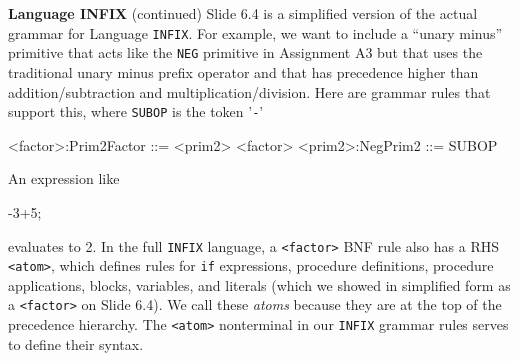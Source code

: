 \begin{minipage}[t]{\sw}
\slidenumber
\LARGE
{\bf Language INFIX} (continued)\exx
Slide 6.4 is a simplified version
of the actual grammar for Language \verb'INFIX'.
For example,
we want to include a ``unary minus'' primitive
that acts like the \verb'NEG' primitive in Assignment A3
but that uses the traditional unary minus prefix operator
and that has precedence higher than addition/subtraction
and multiplication/division.
Here are grammar rules that support this,
where \verb'SUBOP' is the token '\verb'-''
{\Large
\begin{qv}
<factor>:Prim2Factor  ::= <prim2> <factor>
<prim2>:NegPrim2      ::= SUBOP
\end{qv}
}
An expression like
{\Large
\begin{qv}
-3+5;
\end{qv}
}
evaluates to 2.\exx
In the full \verb'INFIX' language,
a \verb'<factor>' BNF rule also has a RHS \verb'<atom>',
which defines rules for 
\verb'if' expressions,
procedure definitions,
procedure applications,
blocks,
variables,
and literals
(which we showed in simplified form as a \verb'<factor>'
on Slide 6.4).
We call these {\em atoms}
because they are at the top of the precedence hierarchy.
The \verb'<atom>' nonterminal in our \verb'INFIX' grammar rules
serves to define their syntax.
\end{minipage}
